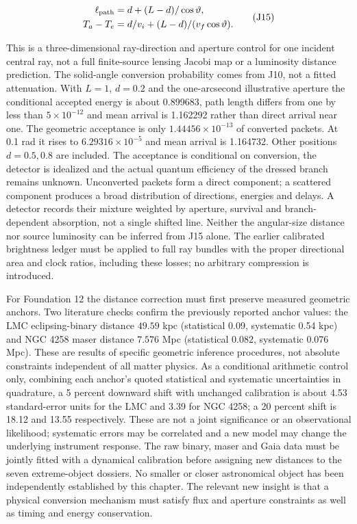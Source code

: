 \documentclass[
  11pt,
  twoside]{article}
\begin{document}
\[\begin{aligned}
\ell_{\rm path}&=d+(L-d)/\cos\vartheta,\\
T_a-T_e&=d/v_i+(L-d)/(v_f\cos\vartheta).
\end{aligned}\tag{J15}\]

This is a three-dimensional ray-direction and aperture control for one
incident central ray, not a full finite-source lensing Jacobi map or a
luminosity distance prediction. The solid-angle conversion probability
comes from J10, not a fitted attenuation. With \(L=1\), \(d=0.2\) and
the one-arcsecond illustrative aperture the conditional accepted energy
is about 0.899683, path length differs from one by less than
\(5\times10^{-12}\) and mean arrival is 1.162292 rather than direct
arrival near one. The geometric acceptance is only
\(1.44456\times10^{-13}\) of converted packets. At 0.1 rad it rises to
\(6.29316\times10^{-5}\) and mean arrival is 1.164732. Other positions
\(d=0.5,0.8\) are included. The acceptance is conditional on conversion,
the detector is idealized and the actual quantum efficiency of the
dressed branch remains unknown. Unconverted packets form a direct
component; a scattered component produces a broad distribution of
directions, energies and delays. A detector records their mixture
weighted by aperture, survival and branch-dependent absorption, not a
single shifted line. Neither the angular-size distance nor source
luminosity can be inferred from J15 alone. The earlier calibrated
brightness ledger must be applied to full ray bundles with the proper
directional area and clock ratios, including these losses; no arbitrary
compression is introduced.

For Foundation 12 the distance correction must first preserve measured
geometric anchors. Two literature checks confirm the previously reported
anchor values: the LMC eclipsing-binary distance \(49.59\) kpc
(statistical 0.09, systematic 0.54 kpc) and NGC 4258 maser distance
\(7.576\) Mpc (statistical 0.082, systematic 0.076 Mpc). These are
results of specific geometric inference procedures, not absolute
constraints independent of all matter physics. As a conditional
arithmetic control only, combining each anchor's quoted statistical and
systematic uncertainties in quadrature, a 5 percent downward shift with
unchanged calibration is about 4.53 standard-error units for the LMC and
3.39 for NGC 4258; a 20 percent shift is 18.12 and 13.55 respectively.
These are not a joint significance or an observational likelihood;
systematic errors may be correlated and a new model may change the
underlying instrument response. The raw binary, maser and Gaia data must
be jointly fitted with a dynamical calibration before assigning new
distances to the seven extreme-object dossiers. No smaller or closer
astronomical object has been independently established by this chapter.
The relevant new insight is that a physical conversion mechanism must
satisfy flux and aperture constraints as well as timing and energy
conservation.
\end{document}
